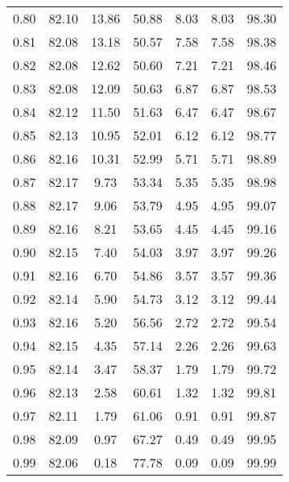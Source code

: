\begin{tabular}{|c|c|c|c|c|c|c|}
      0.80 &     82.10 &     13.86 &      50.88 &    8.03 &       8.03 &         98.30 \\
      0.81 &     82.08 &     13.18 &      50.57 &    7.58 &       7.58 &         98.38 \\
      0.82 &     82.08 &     12.62 &      50.60 &    7.21 &       7.21 &         98.46 \\
      0.83 &     82.08 &     12.09 &      50.63 &    6.87 &       6.87 &         98.53 \\
      0.84 &     82.12 &     11.50 &      51.63 &    6.47 &       6.47 &         98.67 \\
      0.85 &     82.13 &     10.95 &      52.01 &    6.12 &       6.12 &         98.77 \\
      0.86 &     82.16 &     10.31 &      52.99 &    5.71 &       5.71 &         98.89 \\
      0.87 &     82.17 &      9.73 &      53.34 &    5.35 &       5.35 &         98.98 \\
      0.88 &     82.17 &      9.06 &      53.79 &    4.95 &       4.95 &         99.07 \\
      0.89 &     82.16 &      8.21 &      53.65 &    4.45 &       4.45 &         99.16 \\
      0.90 &     82.15 &      7.40 &      54.03 &    3.97 &       3.97 &         99.26 \\
      0.91 &     82.16 &      6.70 &      54.86 &    3.57 &       3.57 &         99.36 \\
      0.92 &     82.14 &      5.90 &      54.73 &    3.12 &       3.12 &         99.44 \\
      0.93 &     82.16 &      5.20 &      56.56 &    2.72 &       2.72 &         99.54 \\
      0.94 &     82.15 &      4.35 &      57.14 &    2.26 &       2.26 &         99.63 \\
      0.95 &     82.14 &      3.47 &      58.37 &    1.79 &       1.79 &         99.72 \\
      0.96 &     82.13 &      2.58 &      60.61 &    1.32 &       1.32 &         99.81 \\
      0.97 &     82.11 &      1.79 &      61.06 &    0.91 &       0.91 &         99.87 \\
      0.98 &     82.09 &      0.97 &      67.27 &    0.49 &       0.49 &         99.95 \\
      0.99 &     82.06 &      0.18 &      77.78 &    0.09 &       0.09 &         99.99 \\
\bottomrule
\end{tabular}

